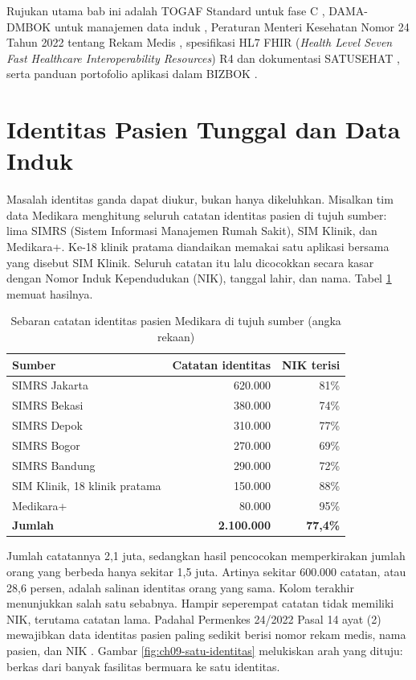 Rujukan utama bab ini adalah TOGAF Standard untuk fase C \cite{togaf10},
DAMA-DMBOK untuk manajemen data induk \cite{dmbok2}, Peraturan Menteri
Kesehatan Nomor 24 Tahun 2022 tentang Rekam Medis \cite{permenkes24-2022},
spesifikasi HL7 FHIR (\textit{Health Level Seven Fast Healthcare
Interoperability Resources}) R4 dan dokumentasi SATUSEHAT \cite{c09-fhir-r4,
c09-satusehat}, serta panduan portofolio aplikasi dalam BIZBOK
\cite{bizbok15}.

\section{Identitas Pasien Tunggal dan Data Induk}

Masalah identitas ganda dapat diukur, bukan hanya dikeluhkan. Misalkan tim
data Medikara menghitung seluruh catatan identitas pasien di tujuh sumber:
lima SIMRS (Sistem Informasi Manajemen Rumah Sakit), SIM Klinik, dan
Medikara+. Ke-18 klinik pratama diandaikan memakai satu aplikasi bersama yang
disebut SIM Klinik. Seluruh catatan itu lalu dicocokkan secara kasar dengan Nomor Induk
Kependudukan (NIK), tanggal lahir, dan nama. Tabel
\ref{tab:ch09-sebaran-identitas} memuat hasilnya.

\begin{table}[!htb]
  \centering
  \caption{Sebaran catatan identitas pasien Medikara di tujuh sumber (angka
           rekaan)}
  \label{tab:ch09-sebaran-identitas}
  \begin{tabularx}{\textwidth}{Xrr}
    \hline
    \textbf{Sumber} & \textbf{Catatan identitas} & \textbf{NIK terisi} \\
    \hline
    SIMRS Jakarta & 620.000 & 81\% \\
    \hline
    SIMRS Bekasi & 380.000 & 74\% \\
    \hline
    SIMRS Depok & 310.000 & 77\% \\
    \hline
    SIMRS Bogor & 270.000 & 69\% \\
    \hline
    SIMRS Bandung & 290.000 & 72\% \\
    \hline
    SIM Klinik, 18 klinik pratama & 150.000 & 88\% \\
    \hline
    Medikara+ & 80.000 & 95\% \\
    \hline
    \textbf{Jumlah} & \textbf{2.100.000} & \textbf{77,4\%} \\
    \hline
  \end{tabularx}
\end{table}

Jumlah catatannya 2,1 juta, sedangkan hasil pencocokan memperkirakan jumlah
orang yang berbeda hanya sekitar 1,5 juta. Artinya sekitar 600.000 catatan,
atau 28,6 persen, adalah salinan identitas orang yang sama. Kolom terakhir
menunjukkan salah satu sebabnya. Hampir seperempat catatan tidak memiliki NIK,
terutama catatan lama. Padahal Permenkes 24/2022 Pasal 14 ayat (2) mewajibkan
data identitas pasien paling sedikit berisi nomor rekam medis, nama pasien,
dan NIK \cite{permenkes24-2022}. Gambar \ref{fig:ch09-satu-identitas}
melukiskan arah yang dituju: berkas dari banyak fasilitas bermuara ke satu
identitas.

